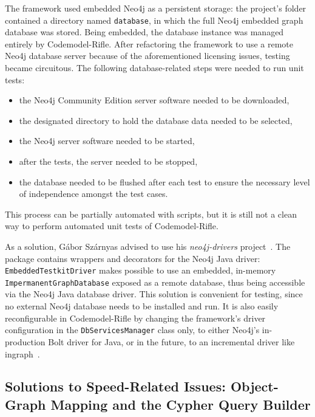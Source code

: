 The framework used embedded Neo4j as a persistent storage: the project's folder contained a directory named \texttt{database}, in which the full Neo4j embedded graph database was stored. Being embedded, the database instance was managed entirely by Codemodel-Rifle. After refactoring the framework to use a remote Neo4j database server because of the aforementioned licensing issues, testing became circuitous. The following database-related steps were needed to run unit tests:

\begin{itemize}
\item the Neo4j Community Edition server software needed to be downloaded,
\item the designated directory to hold the database data needed to be selected,
\item the Neo4j server software needed to be started,
\item after the tests, the server needed to be stopped,
\item the database needed to be flushed after each test to ensure the necessary level of independence amongst the test cases.
\end{itemize}

This process can be partially automated with scripts, but it is still not a clean way to perform automated unit tests of Codemodel-Rifle.

As a solution, Gábor Szárnyas advised to use his \emph{neo4j-drivers} project~\cite{neo4j-drivers}. The package contains wrappers and decorators for the Neo4j Java driver: \texttt{EmbeddedTestkitDriver} makes possible to use an embedded, in-memory \texttt{ImpermanentGraphDatabase} exposed as a remote database, thus being accessible via the Neo4j Java database driver. This solution is convenient for testing, since no external Neo4j database needs to be installed and run. It is also easily reconfigurable in Codemodel-Rifle by changing the framework's driver configuration in the \texttt{DbServicesManager} class only, to either Neo4j's in-production Bolt driver for Java, or in the future, to an incremental driver like ingraph~\cite{ingraph-github}.


\subsection{Solutions to Speed-Related Issues: Object-Graph Mapping and the Cypher Query Builder}

